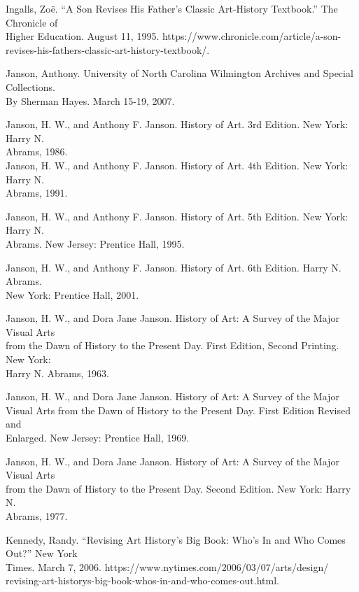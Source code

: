 \documentclass[
  letterpaper,
  DIV=11,
  numbers=noendperiod]{scrreprt}
\begin{document}
Ingalls, Zoë. ``A Son Revises His Father's Classic Art-History
Textbook.'' The Chronicle of\\
Higher Education. August 11, 1995.
https://www.chronicle.com/article/a-son-\\
revises-his-fathers-classic-art-history-textbook/.

Janson, Anthony. University of North Carolina Wilmington Archives and
Special Collections.\\
By Sherman Hayes. March 15-19, 2007.~

Janson, H. W., and Anthony F. Janson. History of Art. 3rd Edition. New
York: Harry N.\\
Abrams, 1986.\\
Janson, H. W., and Anthony F. Janson. History of Art. 4th Edition. New
York: Harry N.\\
Abrams, 1991.

Janson, H. W., and Anthony F. Janson. History of Art. 5th Edition. New
York: Harry N.\\
Abrams. New Jersey: Prentice Hall, 1995.~

Janson, H. W., and Anthony F. Janson. History of Art. 6th Edition. Harry
N. Abrams.\\
New York: Prentice Hall, 2001.

Janson, H. W., and Dora Jane Janson. History of Art: A Survey of the
Major Visual Arts\\
from the Dawn of History to the Present Day. First Edition, Second
Printing. New York:\\
Harry N. Abrams, 1963.~

Janson, H. W., and Dora Jane Janson. History of Art: A Survey of the
Major\\
Visual Arts from the Dawn of History to the Present Day. First Edition
Revised and\\
Enlarged. New Jersey: Prentice Hall, 1969.

Janson, H. W., and Dora Jane Janson. History of Art: A Survey of the
Major Visual Arts\\
from the Dawn of History to the Present Day. Second Edition. New York:
Harry N.\\
Abrams, 1977.~

Kennedy, Randy. ``Revising Art History's Big Book: Who's In and Who
Comes Out?'' New York\\
Times. March 7, 2006. https://www.nytimes.com/2006/03/07/arts/design/\\
revising-art-historys-big-book-whos-in-and-who-comes-out.html.
\end{document}
